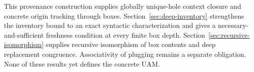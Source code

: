 This provenance construction supplies globally unique-hole context closure and
concrete origin tracking through boxes. Section~\ref{sec:deep-inventory}
strengthens the inventory bound to an exact syntactic characterization and gives
a necessary-and-sufficient freshness condition at every finite box depth.
Section~\ref{sec:recursive-isomorphism} supplies recursive isomorphism of box
contents and deep replacement congruence. Associativity of plugging remains a
separate obligation. None of these results yet defines the concrete UAM.
